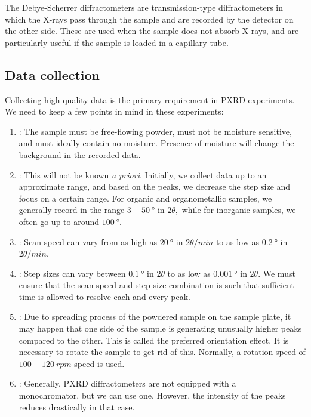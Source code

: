 	The Debye-Scherrer diffractometers are transmission-type diffractometers in which the X-rays pass through the sample and are recorded by the detector on the other side. These are used when the sample does not absorb X-rays, and are particularly useful if the sample is loaded in a capillary tube.
	
\subsection{Data collection}

	Collecting high quality data is the primary requirement in PXRD experiments. We need to keep a few points in mind in these experiments:%
%		
		\begin{enumerate}%
%		
		    \item {}: The sample must be free-flowing powder, must not be moisture sensitive, and must ideally contain no moisture. Presence of moisture will change the background in the recorded data.
		    
		    \item {}: This will not be known \textit{a priori}. Initially, we collect data up to an approximate range, and based on the peaks, we decrease the step size and focus on a certain range. For organic and organometallic samples, we generally record in the range $3-50~\si{\degree}$ in $2\theta,$ while for inorganic samples, we often go up to around $\SI{100}{\degree}.$
		    
		    \item {}: Scan speed can vary from as high as $\SI{20}{\degree}$ in $\si{2\theta \per min}$ to as low as $\SI{0.2}{\degree}$ in $\si{2\theta \per min}.$
		    
		    \item {}: Step sizes can vary between $\SI{0.1}{\degree}$ in $2\theta$ to as low as $\SI{0.001}{\degree}$ in $2\theta.$ We must ensure that the scan speed and step size combination is such that sufficient time is allowed to resolve each and every peak.
		    
		    \item {}: Due to spreading process of the powdered sample on the sample plate, it may happen that one side of the sample is generating unusually higher peaks compared to the other. This is called the preferred orientation effect. It is necessary to rotate the sample to get rid of this. Normally, a rotation speed of $100-120~\si{rpm}$ speed is used.
		    
		    \item {}: Generally, PXRD diffractometers are not equipped with a \\monochromator, but we can use one. However, the intensity of the peaks reduces drastically in that case.
		    
		\end{enumerate}
		
